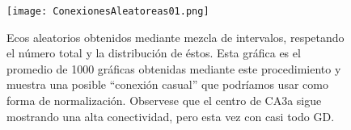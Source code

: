 \documentclass{article}
\begin{document}
\begin{figure}[h]
\centering
\texttt{[image: ConexionesAleatoreas01.png]}
\caption{ Ecos aleatorios obtenidos mediante mezcla de intervalos,
respetando el número total y la distribución de éstos. Esta gráfica
es el promedio de 1000 gráficas obtenidas mediante este procedimiento
y muestra una posible ``conexión casual'' que podríamos usar como
forma de normalización. Observese que el centro de CA3a sigue 
mostrando una alta conectividad, pero esta vez con casi todo GD. 
}\label{RandomGraph}
\end{figure}
\end{document}
